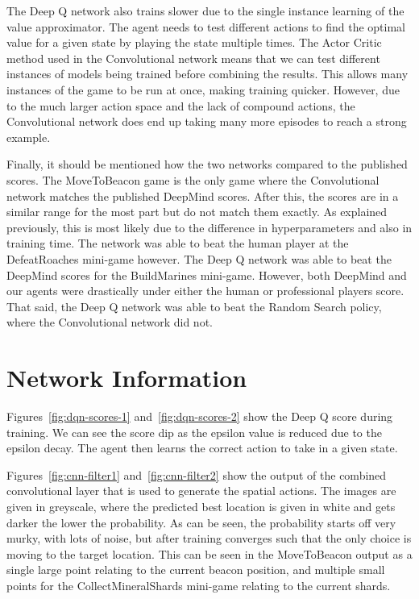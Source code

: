The Deep Q network also trains slower due to the single instance learning of the
value approximator. The agent needs to test different actions to find the
optimal value for a given state by playing the state multiple times. The Actor
Critic method used in the Convolutional network means that we can test different
instances of models being trained before combining the results. This allows many
instances of the game to be run at once, making training quicker. However, due
to the much larger action space and the lack of compound actions, the
Convolutional network does end up taking many more episodes to reach a strong
example.

Finally, it should be mentioned how the two networks compared to the published
scores. The MoveToBeacon game is the only game where the Convolutional network
matches the published DeepMind scores. After this, the scores are in a similar
range for the most part but do not match them exactly. As explained previously,
this is most likely due to the difference in hyperparameters and also in
training time. The network was able to beat the human player at the
DefeatRoaches mini-game however. The Deep Q network was able to beat the
DeepMind scores for the BuildMarines mini-game. However, both DeepMind and our
agents were drastically under either the human or professional players score.
That said, the Deep Q network was able to beat the Random Search policy, where
the Convolutional network did not.

\section{Network Information}

Figures~\ref{fig:dqn-scores-1} and~\ref{fig:dqn-scores-2} show the Deep Q score
during training. We can see the score dip as the epsilon value is reduced due to
the epsilon decay. The agent then learns the correct action to take in a given
state.

Figures~\ref{fig:cnn-filter1} and~\ref{fig:cnn-filter2} show the output of the
combined convolutional layer that is used to generate the spatial actions. The
images are given in greyscale, where the predicted best location is given in
white and gets darker the lower the probability. As can be seen, the
probability starts off very murky, with lots of noise, but after training
converges such that the only choice is moving to the target location. This can
be seen in the MoveToBeacon output as a single large point relating to the
current beacon position, and multiple small points for the CollectMineralShards
mini-game relating to the current shards.

